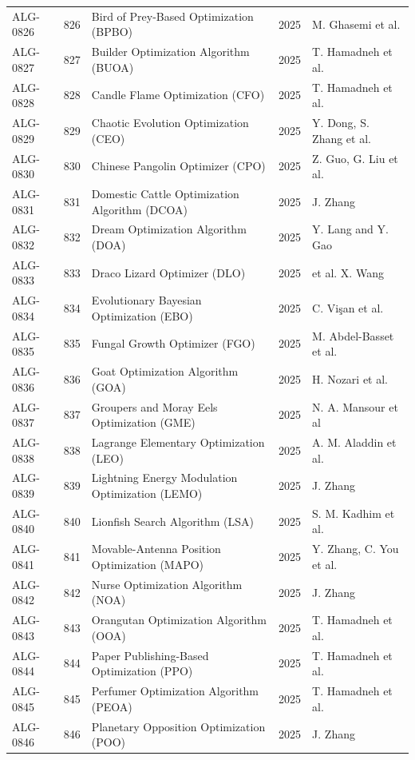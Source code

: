 \documentclass[8pt]{article}
\begin{document}
\begin{landscape}
\begin{longtable}{P{1.7cm}rP{10.0cm}rP{7.2cm}}
ALG-0826 & 826 & Bird of Prey-Based Optimization (BPBO) & 2025 & M. Ghasemi et al. \\
ALG-0827 & 827 & Builder Optimization Algorithm (BUOA) & 2025 & T. Hamadneh et al. \\
ALG-0828 & 828 & Candle Flame Optimization (CFO) & 2025 & T. Hamadneh et al. \\
ALG-0829 & 829 & Chaotic Evolution Optimization (CEO) & 2025 & Y. Dong, S. Zhang et al. \\
ALG-0830 & 830 & Chinese Pangolin Optimizer (CPO) & 2025 & Z. Guo, G. Liu et al. \\
ALG-0831 & 831 & Domestic Cattle Optimization Algorithm (DCOA) & 2025 & J. Zhang \\
ALG-0832 & 832 & Dream Optimization Algorithm (DOA) & 2025 & Y. Lang and Y. Gao \\
ALG-0833 & 833 & Draco Lizard Optimizer (DLO) & 2025 & et al.  X. Wang \\
ALG-0834 & 834 & Evolutionary Bayesian Optimization (EBO) & 2025 & C. Vişan et al. \\
ALG-0835 & 835 & Fungal Growth Optimizer (FGO) & 2025 & M. Abdel-Basset et al. \\
ALG-0836 & 836 & Goat Optimization Algorithm (GOA) & 2025 & H. Nozari et al. \\
ALG-0837 & 837 & Groupers and Moray Eels Optimization (GME) & 2025 & N. A. Mansour et al \\
ALG-0838 & 838 & Lagrange Elementary Optimization (LEO) & 2025 & A. M. Aladdin et al. \\
ALG-0839 & 839 & Lightning Energy Modulation Optimization (LEMO) & 2025 & J. Zhang \\
ALG-0840 & 840 & Lionfish Search Algorithm (LSA) & 2025 & S. M. Kadhim et al. \\
ALG-0841 & 841 & Movable-Antenna Position Optimization (MAPO) & 2025 & Y. Zhang, C. You et al. \\
ALG-0842 & 842 & Nurse Optimization Algorithm (NOA) & 2025 & J. Zhang \\
ALG-0843 & 843 & Orangutan Optimization Algorithm (OOA) & 2025 & T. Hamadneh et al. \\
ALG-0844 & 844 & Paper Publishing-Based Optimization (PPO) & 2025 & T. Hamadneh et al. \\
ALG-0845 & 845 & Perfumer Optimization Algorithm (PEOA) & 2025 & T. Hamadneh et al. \\
ALG-0846 & 846 & Planetary Opposition Optimization (POO) & 2025 & J. Zhang \\

\end{longtable}
\end{landscape}
\end{document}
